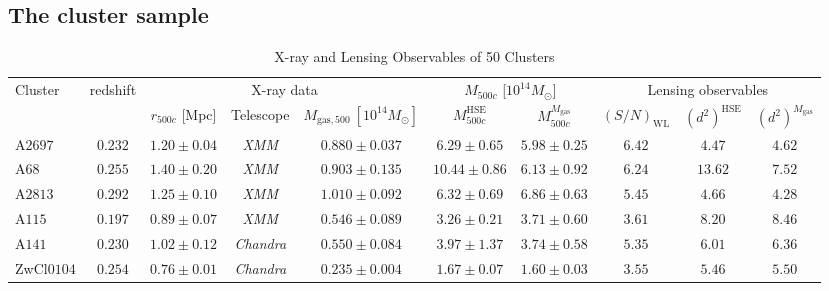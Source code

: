 \documentclass[iop, apj]{emulateapj}
\newcommand{\?}{\stackrel{?}{=}}
\begin{document}
\subsection{The cluster sample}
\label{sec:sample}



 \begin{table*}[H]%
  \begin{center}
    \caption{X-ray and Lensing Observables of 50 Clusters \label{tab:x-ray}}
   \begin{tabular}{lccccccccc}
      \hline \hline
   \multicolumn{1}{l}{Cluster} & \multicolumn{1}{l}{redshift}  &
    \multicolumn{3}{c}{X-ray data} & \multicolumn{2}{c}{$M_{500c}$
    [$10^{14}M_{\odot}$]} & \multicolumn{3}{c}{Lensing observables}\\
	 & & $r_{500c}$ [Mpc] &Telescope & $M_{\mathrm{gas},500}~
		    [10^{14}M_\odot]$
		    &$M^\mathrm{HSE}_{500c}$ &
    $M^{M_\mathrm{gas}}_{500c}$ &
    $({S/N})_\mathrm{WL}$ & $(d^2)^\mathrm{HSE}$ & $(d^2)^{M_\mathrm{gas}}$\\%
 \hline 
A$2697$ &$0.232$ &$1.20\pm0.04$ &{\it XMM} &$0.880\pm0.037$   &$6.29\pm0.65$ &$5.98\pm0.25$  & $6.42$ & $4.47$  & $4.62$  \\%
 A$68$ &$0.255$ &$1.40\pm0.20$ &{\it XMM} &$0.903\pm0.135$   &$10.44\pm0.86$ &$6.13\pm0.92$ & $6.24$ & $13.62$ & $7.52$  \\%
 A$2813$ &$0.292$ &$1.25\pm0.10$ &{\it XMM} &$1.010\pm0.092$   &$6.32\pm0.69$ &$6.86\pm0.63$  & $5.45$ & $4.66$  & $4.28$  \\%
 A$115$ &$0.197$ &$0.89\pm0.07$ &{\it XMM} &$0.546\pm0.089$   &$3.26\pm0.21$ &$3.71\pm0.60$  & $3.61$ & $8.20$  & $8.46$  \\%
 A$141$ &$0.230$ &$1.02\pm0.12$ &{\it Chandra}	  &$0.550\pm0.084$ &$3.97\pm1.37$ &$3.74\pm0.58$      & $5.35$ & $6.01$  & $6.36$  \\%
 ZwCl$0104$ &$0.254$ &$0.76\pm0.01$ &{\it Chandra} &$0.235\pm0.004$ &$1.67\pm0.07$ &$1.60\pm0.03$      & $3.55$ & $5.46$  & $5.50$  \\%

\end{tabular}
\end{center}
\end{table*}
\end{document}
